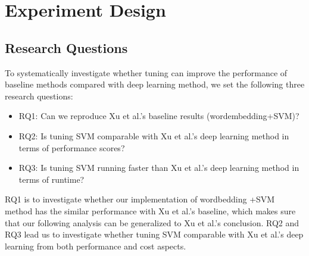 \documentclass[sigconf,review, anonymous]{acmart}
\theoremstyle{break}
\newcommand{\bi}{\begin{itemize}[leftmargin=0.4cm]}
\newcommand{\ei}{\end{itemize}}
\begin{document}
 



\section{Experiment Design}
\subsection{Research Questions}\label{RQ}
 To systematically investigate whether tuning can improve the 
 performance of baseline methods compared with deep learning method, we set
 the following three research questions:
 
 \bi
 \item RQ1: Can we reproduce Xu et al.'s baseline results (wordembedding+SVM)?
 \item RQ2: Is tuning SVM comparable with Xu et al.'s deep learning method in terms of performance scores?
 \item RQ3: Is tuning SVM running faster than Xu et al.'s deep learning method in terms of runtime?
 \ei
 
 RQ1 is to investigate whether our implementation of wordbedding +SVM method has
 the similar performance with Xu et al.'s baseline, which makes sure that our following 
 analysis can be generalized to Xu et al.'s conclusion. RQ2 and RQ3 lead us to
 investigate whether tuning SVM comparable with Xu et al.'s deep learning from both 
 performance and cost aspects.
 
\end{document}
